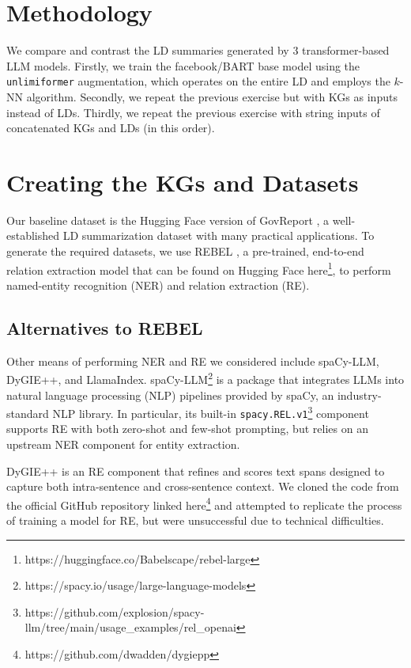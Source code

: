 \documentclass[12pt]{article}
\begin{document}
\section{Methodology}
We compare and contrast the LD summaries generated by 3 transformer-based LLM
models. Firstly, we train the facebook/BART base model using the
\texttt{unlimiformer} augmentation, which operates on the entire LD and employs
the $k$-NN algorithm. Secondly, we repeat the previous exercise but with KGs as
inputs instead of LDs. Thirdly, we repeat the previous exercise with string
inputs of concatenated KGs and LDs (in this order).

\section{Creating the KGs and Datasets}
Our baseline dataset is the Hugging Face version of GovReport
\cite{huang2021efficient}, a well-established LD summarization dataset with
many practical applications. To generate the required datasets, we use REBEL
\cite{huguet2021rebel}, a pre-trained, end-to-end relation extraction model
that can be found on Hugging Face
here\footnote{https://huggingface.co/Babelscape/rebel-large}, to perform
named-entity recognition (NER) and relation extraction (RE).




\subsection*{Alternatives to REBEL}

Other means of performing NER and RE we considered include spaCy-LLM, DyGIE++,
and LlamaIndex. spaCy-LLM\footnote{https://spacy.io/usage/large-language-models}
is a package that integrates LLMs into natural language processing (NLP) pipelines
provided by spaCy, an industry-standard NLP library.
In particular, its built-in
\texttt{spacy.REL.v1}\footnote{https://github.com/explosion/spacy-llm/tree/main/usage\_examples/rel\_openai}
component supports RE with both zero-shot and few-shot prompting, but relies on an upstream NER component for entity extraction. 

DyGIE++ is an RE component that refines and scores text spans designed to
capture both intra-sentence and cross-sentence context. We cloned the code from
the official GitHub repository linked
here\footnote{https://github.com/dwadden/dygiepp} and attempted to replicate
the process of training a model for RE, but were unsuccessful due to technical
difficulties. 
\end{document}
